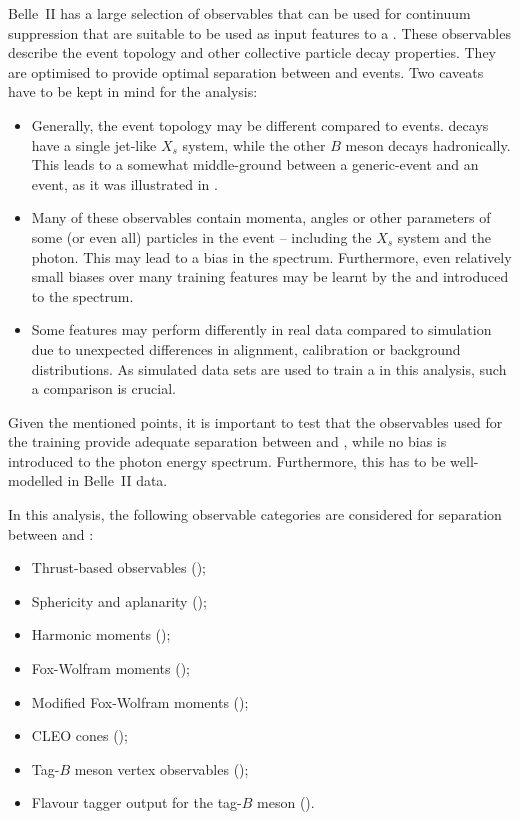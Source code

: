 Belle~II has a large selection of observables that can be used for continuum suppression that are suitable to be used as input features to a \BDT.
These observables describe the event topology and other collective particle decay properties. 
They are optimised to provide optimal separation between \BB and \qqbar events.
Two caveats have to be kept in mind for the \BtoXsgamma analysis:
\begin{itemize}
    \item Generally, the \BtoXsgamma event topology may be different compared to \BB events. 
    \BtoXsgamma decays have a single jet-like $X_s$ system, while the other $B$ meson decays hadronically.
    This leads to a somewhat middle-ground between a generic-\BB event and an \epem\ra\qqbar event, as it was illustrated in .
    \item Many of these observables contain momenta, angles or other parameters of some (or even all) particles in the event -- including the $X_s$ system and the photon.
    This may lead to a bias in the \EB spectrum.
    Furthermore, even relatively small biases over many training features may be learnt by the \BDT and introduced to the spectrum.
    \item Some features may perform differently in real data compared to simulation due to unexpected differences in alignment, calibration or background distributions.
    As simulated data sets are used to train a \BDT in this analysis, such a comparison is crucial.
\end{itemize}
Given the mentioned points, it is important to test that the observables used for the training provide adequate separation between \BtoXsgamma and \qqbar, while no bias is introduced to the photon energy spectrum.
Furthermore, this has to be well-modelled in Belle~II data.

In this analysis, the following observable categories are considered for separation between \epem\ra\qqbar and \BtoXsgamma:
\begin{itemize}
    \item Thrust-based observables ();
    \item Sphericity and aplanarity ();
    \item Harmonic moments ();
    \item Fox-Wolfram moments ();
    \item Modified Fox-Wolfram moments ();
    \item CLEO cones ();
    \item Tag-$B$ meson vertex observables ();
    \item Flavour tagger output for the tag-$B$ meson ().
\end{itemize}

